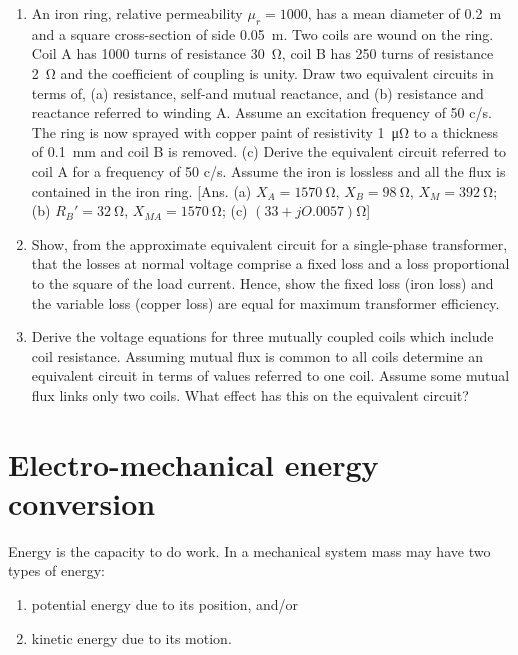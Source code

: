 \documentclass[a4paper,numbers=noenddot,12pt]{scrbook}
\begin{document}
\begin{enumerate}[label={\thechapter.\arabic*},leftmargin=*]
                    \item An iron ring, relative permeability $\mu_r = 1000$, has a mean diameter of \SI{0.2}{\meter} and a square cross-section of side \SI{0.05}{\meter}.
                        Two coils are wound on the ring. Coil A has 1000 turns of resistance \SI{30}{\ohm}, coil B has 250 turns of resistance \SI{2}{\ohm} and the coefficient of coupling is unity. 
                        Draw two equivalent circuits in terms of, 
                        (a) resistance, self-and mutual reactance, and
                        (b) resistance and reactance referred to winding A. 
                        Assume an excitation frequency of 50 c/s. 
                        The ring is now sprayed with copper paint of resistivity \SI{1}{\micro\ohm} to a thickness of \SI{0.1}{\milli\metre} and coil B is removed.
                        (c) Derive the equivalent circuit referred to coil A for a frequency of 50 c/s.
                        Assume the iron is lossless and all the flux is contained in the iron ring.
                        [Ans. (a) $X_A = \SI{1570}{\ohm}$, $X_B = \SI{98}{\ohm}$, $X_M = \SI{392}{\ohm}$; (b) $R_B' = \SI{32}{\ohm}$, $X_{MA} = \SI{1570}{\ohm}$; (c) $(33 + jO.0057)\si{\ohm}$] 

                    \item Show, from the approximate equivalent circuit for a single-phase transformer, that the losses at normal voltage comprise a fixed loss and a loss proportional to the square of the load current. 
                        Hence, show the fixed loss (iron loss) and the variable loss (copper loss) are equal for maximum transformer efficiency.

                    \item Derive the voltage equations for three mutually coupled coils which include coil resistance.
                        Assuming mutual flux is common to all coils determine an equivalent circuit in terms of values referred to one coil. 
                        Assume some mutual flux links only two coils. What effect has this on the equivalent circuit?
                \end{enumerate}
            \endgroup



            \chapter{Electro-mechanical energy conversion}
            Energy is the capacity to do work. In a mechanical system mass may have two types of energy:
            \begin{enumerate}
                \item potential energy due to its position, and/or
                \item kinetic energy due to its motion.
            \end{enumerate}
\end{document}
